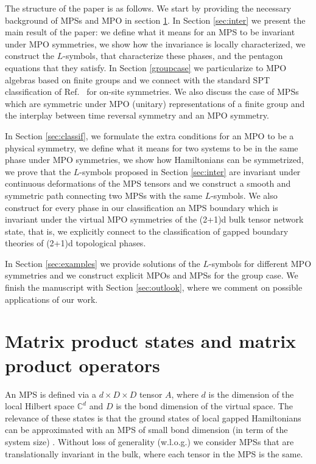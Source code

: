 \documentclass[a4paper,twocolumn,11pt,accepted=2023-02-10]{quantumarticle}
\begin{document}
The structure of the paper is as follows. We start by providing the necessary background of MPSs and MPO in section \ref{sec:data}. In Section \ref{sec:inter} we present the main result of the paper: we define what it means for an MPS to be invariant under MPO symmetries, we show how the invariance is locally characterized, we construct the $L$-symbols, that characterize these phases, and the pentagon equations that they satisfy. In Section \ref{groupcase} we particularize to MPO algebras based on finite groups and we connect with the standard SPT classification of Ref.\ \cite{Schuch11} for on-site symmetries. We also discuss the case of MPSs which are symmetric under MPO (unitary) representations of a finite group and the interplay between time reversal symmetry and an MPO symmetry.

In Section \ref{sec:classif}, we formulate the extra conditions for an MPO to be a physical symmetry, we define what it means for two systems to be in the same phase under MPO symmetries, we show how Hamiltonians can be symmetrized, we prove that the $L$-symbols proposed in Section \ref{sec:inter} are invariant under continuous deformations of the MPS tensors and we construct a smooth and symmetric path connecting two MPSs with the same $L$-symbols. We also construct for every phase in our classification an MPS boundary which is invariant under the virtual MPO symmetries of the (2+1)d bulk tensor network state, that is, we explicitly connect to the classification of gapped boundary theories of (2+1)d topological phases. 

In Section \ref{sec:examples} we provide solutions of the ${L}$-symbols for different MPO symmetries and we construct explicit MPOs and MPSs for the group case. We finish the manuscript with Section \ref{sec:outlook}, where we comment on possible applications of our work.


\section{ Matrix product states and matrix product operators}\label{sec:data}

An MPS is defined via a $d\times D\times D$  tensor $A$, where $d$ is the dimension of the local Hilbert space $\mathbb{C}^d$ and $D$ is the bond dimension of the virtual space. The relevance of these states is that the ground states of local gapped Hamiltonians can be approximated with an MPS of small bond dimension (in term of the system size) \cite{Hastings07A}. Without loss of generality (w.l.o.g.) we consider MPSs that are translationally invariant in the bulk, where each tensor in the MPS is the same.
\end{document}

